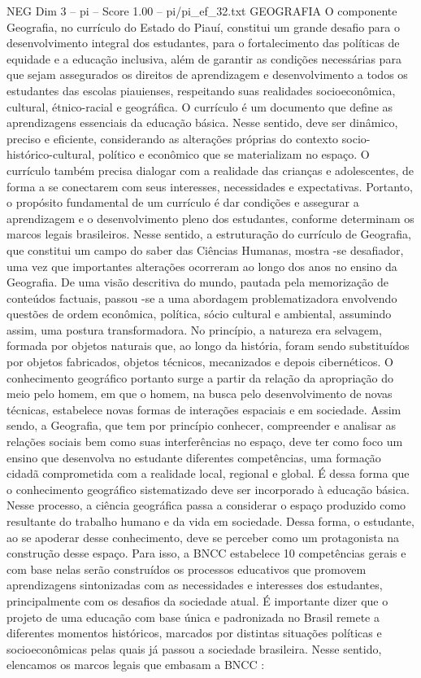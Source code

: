 \begin{textsample}{NEG Dim 3 – pi – Score 1.00 – pi/pi\_ef\_32.txt}  \label{ex:f3_neg_037}
GEOGRAFIA O componente Geografia, no currículo do Estado do Piauí, constitui um grande desafio para o desenvolvimento integral dos estudantes, para o fortalecimento das políticas de equidade e a educação inclusiva, além de garantir as condições necessárias para que sejam assegurados os direitos de aprendizagem e desenvolvimento a todos os estudantes das escolas piauienses, respeitando suas realidades socioeconômica, cultural, étnico-racial e geográfica.
O currículo é um documento que define as aprendizagens essenciais da educação básica.
Nesse sentido, deve ser dinâmico, preciso e eficiente, considerando as alterações próprias do contexto socio-histórico-cultural, político e econômico que se materializam no espaço.
O currículo também precisa dialogar com a realidade das crianças e adolescentes, de forma a se conectarem com seus interesses, necessidades e expectativas.
Portanto, o propósito fundamental de um currículo é dar condições e assegurar a aprendizagem e o desenvolvimento pleno dos estudantes, conforme determinam os marcos legais brasileiros.
Nesse sentido, a estruturação do currículo de Geografia, que constitui um campo do saber das Ciências Humanas, mostra -se desafiador, uma vez que importantes alterações ocorreram ao longo dos anos no ensino da Geografia.
De uma visão descritiva do mundo, pautada pela memorização de conteúdos factuais, passou -se a uma abordagem problematizadora envolvendo questões de ordem econômica, política, sócio cultural e ambiental, assumindo assim, uma postura transformadora.
No princípio, a natureza era selvagem, formada por objetos naturais que, ao longo da história, foram sendo substituídos por objetos fabricados, objetos técnicos, mecanizados e depois cibernéticos.
O conhecimento geográfico portanto surge a partir da relação da apropriação do meio pelo homem, em que o homem, na busca pelo desenvolvimento de novas técnicas, estabelece novas formas de interações espaciais e em sociedade.
Assim sendo, a Geografia, que tem por princípio conhecer, compreender e analisar as relações sociais bem como suas interferências no espaço, deve ter como foco um ensino que desenvolva no estudante diferentes competências, uma formação cidadã comprometida com a realidade local, regional e global.
É dessa forma que o conhecimento geográfico sistematizado deve ser incorporado à educação básica.
Nesse processo, a ciência geográfica passa a considerar o espaço produzido como resultante do trabalho humano e da vida em sociedade.
Dessa forma, o estudante, ao se apoderar desse conhecimento, deve se perceber como um protagonista na construção desse espaço.
Para isso, a BNCC estabelece 10 competências gerais e com base nelas serão construídos os processos educativos que promovem aprendizagens sintonizadas com as necessidades e interesses dos estudantes, principalmente com os desafios da sociedade atual.
É importante dizer que o projeto de uma educação com base única e padronizada no Brasil remete a diferentes momentos históricos, marcados por distintas situações políticas e socioeconômicas pelas quais já passou a sociedade brasileira.
Nesse sentido, elencamos os marcos legais que embasam a BNCC :

\end{textsample}
